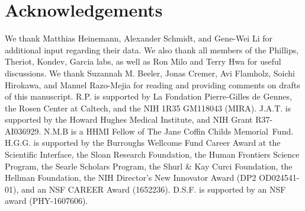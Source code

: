 \section{Acknowledgements}
We thank Matthias Heinemann, Alexander Schmidt, and Gene-Wei Li for additional
input regarding their data. We also thank all members of the Phillips, Theriot,
Kondev, Garcia labs, as well as Ron Milo and Terry Hwa for useful discussions.
We thank Suzannah M. Beeler, Jonas Cremer, Avi Flamholz, Soichi Hirokawa, and Manuel
Razo-Mejia for reading and providing comments on drafts of this manuscript. R.P.
is supported by La Fondation Pierre-Gilles de Gennes, the Rosen Center at
Caltech, and the NIH 1R35 GM118043 (MIRA). J.A.T. is supported by the Howard
Hughes Medical Institute, and NIH Grant R37-AI036929. N.M.B is a HHMI Fellow of
The Jane Coffin Childs Memorial Fund. H.G.G. is supported by the Burroughs
Wellcome Fund Career Award at the Scientific Interface, the Sloan Research
Foundation, the Human Frontiers Science Program, the Searle Scholars Program,
the Shurl \& Kay Curci Foundation, the Hellman Foundation, the NIH Director’s
New Innovator Award (DP2 OD024541-01), and an NSF CAREER Award (1652236). D.S.F.
is supported by an NSF award (PHY-1607606).
